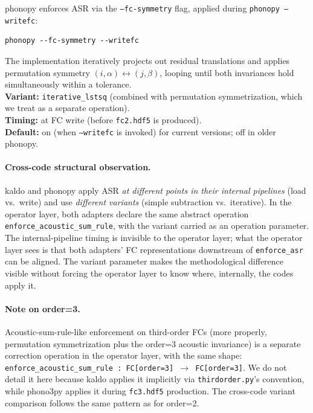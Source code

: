 \documentclass[11pt,a4paper]{article}
\begin{document}
\begin{phonobox}
phonopy enforces ASR via the \texttt{--fc-symmetry} flag, applied during
\texttt{phonopy --writefc}:
\begin{verbatim}
phonopy --fc-symmetry --writefc
\end{verbatim}
The implementation iteratively projects out residual translations and applies permutation
symmetry $(i,\alpha)\leftrightarrow(j,\beta)$, looping until both invariances hold simultaneously
within a tolerance.\\
\textbf{Variant:} \texttt{iterative\_lstsq} (combined with permutation symmetrization, which we
treat as a separate operation).\\
\textbf{Timing:} at FC write (before \texttt{fc2.hdf5} is produced).\\
\textbf{Default:} on (when \texttt{--writefc} is invoked) for current versions; off in older
phonopy.
\end{phonobox}

\paragraph{Cross-code structural observation.} kaldo and phonopy apply ASR \emph{at different
points in their internal pipelines} (load vs.\ write) and use \emph{different variants} (simple
subtraction vs.\ iterative). In the operator layer, both adapters declare the same abstract operation
\texttt{enforce\_acoustic\_sum\_rule}, with the variant carried as an operation parameter. The
internal-pipeline timing is invisible to the operator layer; what the operator layer sees is that both
adapters' FC representations downstream of \texttt{enforce\_asr} can be aligned. The variant
parameter makes the methodological difference visible without forcing the operator layer to know
where, internally, the codes apply it.

\paragraph{Note on order=3.} Acoustic-sum-rule-like enforcement on third-order FCs (more
properly, permutation symmetrization plus the order=3 acoustic invariance) is a separate
correction operation in the operator layer, with the same shape:
\texttt{enforce\_acoustic\_sum\_rule\,:\,FC[order=3]\,$\to$\,FC[order=3]}. We do not detail it
here because kaldo applies it implicitly via \texttt{thirdorder.py}'s convention, while
phono3py applies it during \texttt{fc3.hdf5} production. The cross-code variant comparison
follows the same pattern as for order=2.
\end{document}
